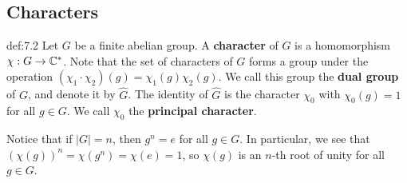 \newpage 
\subsection{Characters}\label{subsec:7.2}

\vspace{2ex}
\begin{defn}{def:7.2}
    Let $G$ be a finite abelian group. A {\bf character} of $G$ is a homomorphism 
    $\chi : G \to \mathbb{C}^*$. Note that the set of characters of $G$ forms a group 
    under the operation $(\chi_1 \cdot \chi_2)(g) = \chi_1(g) \chi_2(g)$. 
    We call this group the {\bf dual group} of $G$, and denote it by $\hat G$. 
    The identity of $\hat G$ is the character $\chi_0$ with $\chi_0(g) = 1$
    for all $g \in G$. We call $\chi_0$ the {\bf principal character}. 
\end{defn}

Notice that if $|G| = n$, then $g^n = e$ for all $g \in G$. In particular, we see that 
$(\chi(g))^n = \chi(g^n) = \chi(e) = 1$, so $\chi(g)$ is an $n$-th root of unity 
for all $g \in G$. 

